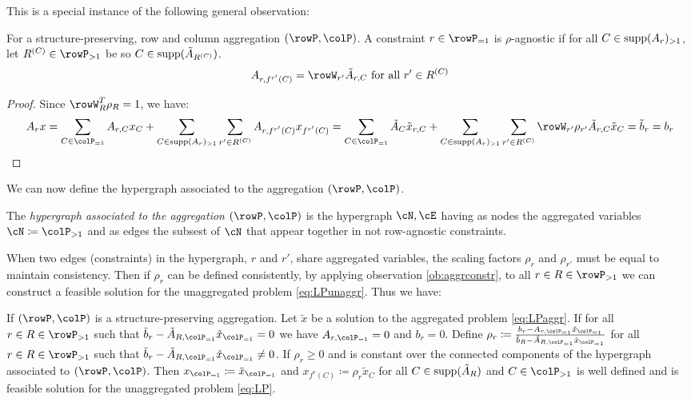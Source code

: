 {This is a special instance of the following general observation:
\begin{observation}
  For a structure-preserving, row and column aggregation \((\rowP,\colP)\). A constraint \(r \in \rowP_{=1}\) is \(\rho\)-agnostic if for all \(C \in \operatorname{supp}(A_{r})_{>1}\), let \(R^{(C)} \in \rowP_{>1}\) be so \(C \in \operatorname{supp}(\tilde{A}_{R^{(C)}})\).
  \[A_{r,f^{r'}(C)} = \rowW_{r'}\tilde{A}_{r,C} \text{ for all } r' \in R^{(C)} \]
   
\end{observation}

\begin{proof}
Since \(\rowW_R^T \rho_R = 1\), we have:
  \[
  A_rx = \sum_{C \in \colP_{=1}}A_{r,C}x_{C} +  \sum_{C \in \supp(A_{r})_{>1}} \sum_{r' \in R^{(C)}} A_{r,f^{r'}(C)}x_{f^{r'}(C)} = \sum_{C \in \colP_{=1}}\tilde{A}_{C}\tilde{x}_{r,C} +  \sum_{C \in \supp(A_{r})_{>1}} \sum_{r' \in R^{(C)}}\rowW_{r'} \rho_{r'}\tilde{A}_{r,C}\tilde{x}_{C} = \tilde{b}_r = b_r
   \]
\end{proof}

We can now define the hypergraph associated to the aggregation \((\rowP, \colP)\).
\begin{definition}
  The \emph{hypergraph associated to the aggregation \((\rowP, \colP)\)} is the hypergraph \(\cN, \cE\) having as nodes the aggregated variables \(\cN \coloneqq \colP_{>1}\) and as edges the subsest of \(\cN\) that appear together in not row-agnostic constraints.
\end{definition}

When two edges (constraints) in the hypergraph, \(r\) and \(r'\), share aggregated variables, the scaling factors \(\rho_r\) and \(\rho_{r'}\) must be equal to maintain consistency. 
Then if \(\rho_r\) can be defined consistently, by applying observation \ref{ob:aggrconstr}, to all \(r \in R \in \rowP_{>1}\) we can construct a feasible solution for the unaggregated problem \eqref{eq:LPunaggr}. Thus we have: 
\begin{proposition}
\label{prop:xaggfeasible}
If \((\rowP, \colP)\) is a structure-preserving aggregation. Let \(\tilde{x}\) be a solution 
to the aggregated problem \eqref{eq:LPaggr}. If for all \(r \in R \in \rowP_{>1}\) such that  \(\tilde{b}_r - \tilde{A}_{R, \colP_{=1}} \tilde{x}_{\colP_{=1}} = 0\) we have \(A_{r,\colP_{=1}} = 0\) and \(b_r=0\).
Define \(\rho_r \coloneqq \frac{b_r - A_{r, \colP_{=1}} \tilde{x}_{\colP_{=1}}}{\tilde{b}_R - \tilde{A}_{R, \colP_{=1}} \tilde{x}_{\colP_{=1}}}\) for all \(r \in R \in \rowP_{>1}\) such that   \(\tilde{b}_r - \tilde{A}_{R, \colP_{=1}} \tilde{x}_{\colP_{=1}} \neq 0\). If \(\rho_r \geq 0\) and is constant over the connected components of the hypergraph associated to \((\rowP, \colP)\). 
Then \(x_{\colP_{=1}} \coloneqq \tilde{x}_{\colP_{=1}}\) and \(x_{f^r(C)} \coloneqq \rho_r \tilde{x}_C\) for all \(C \in \operatorname{supp}(\tilde{A}_R)\) and \(C \in \colP_{>1}\) is well defined and is feasible solution for the unaggregated problem \eqref{eq:LP}.
\end{proposition}


}
